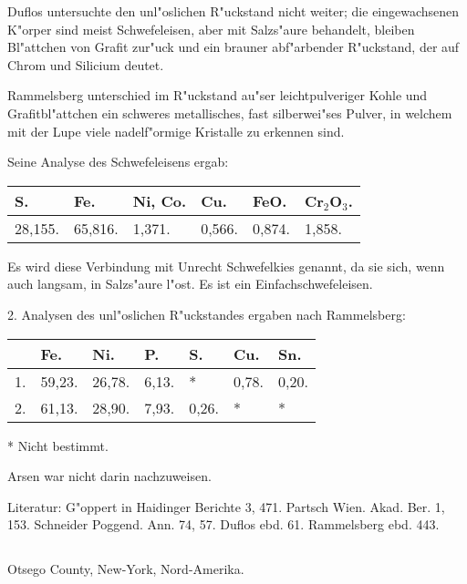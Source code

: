 \documentclass[a4paper, 11pt, oneside]{article}
\begin{document}
Duflos untersuchte den unl"oslichen R"uckstand nicht weiter; die eingewachsenen K"orper sind meist Schwefeleisen, aber mit Salzs"aure behandelt, bleiben Bl"attchen von Grafit zur"uck und ein brauner abf"arbender R"uckstand, der auf Chrom und Silicium deutet.

Rammelsberg unterschied im R"uckstand au"ser leichtpulveriger Kohle und Grafitbl"attchen ein schweres metallisches, fast silberwei"ses Pulver, in welchem mit der Lupe viele nadelf"ormige Kristalle zu erkennen sind.

Seine Analyse des Schwefeleisens ergab:
\begin{table}[H]
    \centering\swabfamily\Large
    \begin{tabular}{l l l l l l}
        S. & Fe. & Ni, Co. & Cu. & FeO. & Cr$_{2}$O$_{3}$. \\ \hline
        28,155. & 65,816. & 1,371. & 0,566. & 0,874. & 1,858. \\
    \end{tabular}
\end{table}

Es wird diese Verbindung mit Unrecht Schwefelkies genannt, da sie sich, wenn auch langsam, in Salzs"aure l"ost. Es ist ein Einfachschwefeleisen.

2. Analysen des unl"oslichen R"uckstandes ergaben nach Rammelsberg:
\begin{table}[H]
    \centering\swabfamily\Large
    \begin{tabular}{l l l l l l l}
         & Fe. & Ni. & P. & S. & Cu. & Sn. \\ \hline
        1. & 59,23. & 26,78. & 6,13. & * & 0,78. & 0,20. \\
        2. & 61,13. & 28,90. & 7,93. & 0,26. & * & * \\
    \end{tabular}
\end{table}

* Nicht bestimmt.

Arsen war nicht darin nachzuweisen.

\normalsize
Literatur: G"oppert in Haidinger Berichte 3, 471. Partsch Wien. Akad. Ber. 1, 153. Schneider Poggend. Ann. 74, 57. Duflos ebd. 61. Rammelsberg ebd. 443.

\subsection{}
\LARGE
\paragraph{}
Otsego County, New-York, Nord-Amerika.
\end{document}
